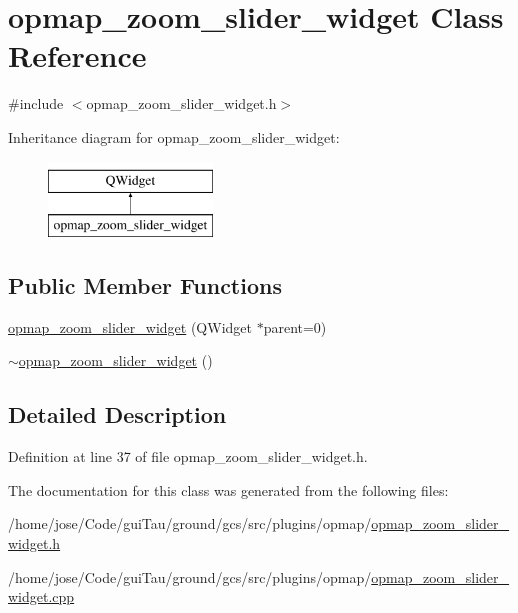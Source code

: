 \hypertarget{classopmap__zoom__slider__widget}{\section{opmap\-\_\-zoom\-\_\-slider\-\_\-widget Class Reference}
\label{classopmap__zoom__slider__widget}
}


{\ttfamily \#include $<$opmap\-\_\-zoom\-\_\-slider\-\_\-widget.\-h$>$}

Inheritance diagram for opmap\-\_\-zoom\-\_\-slider\-\_\-widget\-:\begin{figure}[H]
\begin{center}
\leavevmode
\includegraphics[height=2.000000cm]{classopmap__zoom__slider__widget}
\end{center}
\end{figure}
\subsection*{Public Member Functions}
\begin{DoxyCompactItemize}
\item 
\hyperlink{group___o_p_map_plugin_ga95e119b3d479e4740f8231bef84b59ac}{opmap\-\_\-zoom\-\_\-slider\-\_\-widget} (Q\-Widget $\ast$parent=0)
\item 
\hyperlink{group___o_p_map_plugin_gab379eba250616b76de62dd392fa0e14d}{$\sim$opmap\-\_\-zoom\-\_\-slider\-\_\-widget} ()
\end{DoxyCompactItemize}


\subsection{Detailed Description}


Definition at line 37 of file opmap\-\_\-zoom\-\_\-slider\-\_\-widget.\-h.



The documentation for this class was generated from the following files\-:\begin{DoxyCompactItemize}
\item 
/home/jose/\-Code/gui\-Tau/ground/gcs/src/plugins/opmap/\hyperlink{opmap__zoom__slider__widget_8h}{opmap\-\_\-zoom\-\_\-slider\-\_\-widget.\-h}\item 
/home/jose/\-Code/gui\-Tau/ground/gcs/src/plugins/opmap/\hyperlink{opmap__zoom__slider__widget_8cpp}{opmap\-\_\-zoom\-\_\-slider\-\_\-widget.\-cpp}\end{DoxyCompactItemize}
